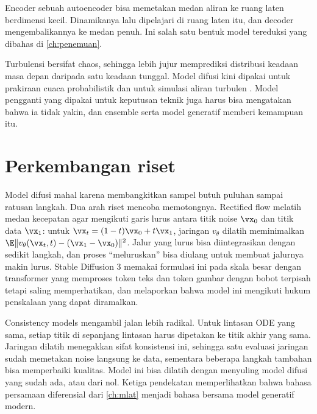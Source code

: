 Encoder sebuah autoencoder bisa memetakan medan aliran ke ruang laten berdimensi kecil.
Dinamikanya lalu dipelajari di ruang laten itu, dan decoder mengembalikannya ke medan penuh. Ini
salah satu bentuk model tereduksi yang dibahas di \cref{ch:penemuan}.

Turbulensi bersifat chaos, sehingga lebih jujur memprediksi distribusi keadaan masa depan daripada
satu keadaan tunggal. Model difusi kini dipakai untuk prakiraan cuaca probabilistik
\citep{price2025} dan untuk simulasi aliran turbulen \citep{kohl2023}. Model pengganti yang dipakai
untuk keputusan teknik juga harus bisa mengatakan bahwa ia tidak yakin, dan ensemble serta model
generatif memberi kemampuan itu.

\section{Perkembangan riset}

Model difusi mahal karena membangkitkan sampel butuh puluhan sampai ratusan langkah. Dua arah riset mencoba memotongnya.
Rectified flow \citep{liu2023} melatih medan kecepatan agar mengikuti garis lurus antara titik noise $\vx_0$ dan titik
data $\vx_1$: untuk $\vx_t=(1-t)\vx_0+t\vx_1$, jaringan $v_\theta$ dilatih meminimalkan
$\E\|v_\theta(\vx_t,t)-(\vx_1-\vx_0)\|^2$. Jalur yang lurus bisa diintegrasikan dengan sedikit langkah, dan proses
``meluruskan'' bisa diulang untuk membuat jalurnya makin lurus. Stable Diffusion 3 \citep{esser2024} memakai formulasi ini
pada skala besar dengan transformer yang memproses token teks dan token gambar dengan bobot terpisah tetapi saling
memperhatikan, dan melaporkan bahwa model ini mengikuti hukum penskalaan yang dapat diramalkan.

Consistency models \citep{song2023consistency} mengambil jalan lebih radikal. Untuk lintasan ODE yang sama, setiap titik
di sepanjang lintasan harus dipetakan ke titik akhir yang sama. Jaringan dilatih menegakkan sifat konsistensi ini, sehingga
satu evaluasi jaringan sudah memetakan noise langsung ke data, sementara beberapa langkah tambahan bisa memperbaiki
kualitas. Model ini bisa dilatih dengan menyuling model difusi yang sudah ada, atau dari nol. Ketiga pendekatan
memperlihatkan bahwa bahasa persamaan diferensial dari \cref{ch:mlat} menjadi bahasa bersama model generatif modern.

